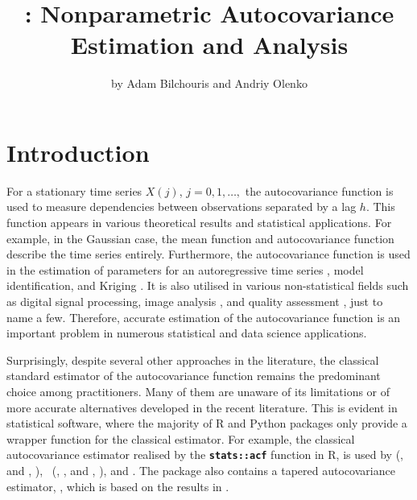 \title{: Nonparametric Autocovariance Estimation and
Analysis}
\author{by Adam Bilchouris and Andriy Olenko}


\maketitle

\section{Introduction}\label{introduction}

For a stationary time series \(X(j)\), \(j = 0, 1, \dots,\) the
autocovariance function is used to measure dependencies between
observations separated by a lag \(h.\) This function appears in various
theoretical results and statistical applications. For example, in the
Gaussian case, the mean function and autocovariance function describe
the time series entirely. Furthermore, the autocovariance function is
used in the estimation of parameters for an autoregressive time series
\citep[Chapter~8.1]{Brockwell1991}, model identification, and Kriging
\citep[Chapter~3.2]{Cressie1993}. It is also utilised in various
non-statistical fields such as digital signal processing, image analysis
\citep[Chapter~3.2]{Bull2021}, and quality assessment \citep{chemo2003},
just to name a few. Therefore, accurate estimation of the autocovariance
function is an important problem in numerous statistical and data
science applications.

Surprisingly, despite several other approaches in the literature, the
classical standard estimator of the autocovariance function remains the
predominant choice among practitioners. Many of them are unaware of its
limitations or of more accurate alternatives developed in the recent
literature. This is evident in statistical software, where the majority
of R and Python packages only provide a wrapper function for the
classical estimator. For example, the classical autocovariance estimator
realised by the \textbf{\texttt{stats::acf}} function in R, is used by
 (\citeauthor{TSA_2022}, \citeyear{TSA_2022} and
\citeauthor{Cryer2008}, \citeyear{Cryer2008}),
~(\citeauthor{astsa_2024}, \citeyear{astsa_2024}, and
\citeauthor{Shumway2025}, \citeyear{Shumway2025}), 
\citep{sarima_2024} and  \citep{Hyndman2008}. The
package  also contains a tapered autocovariance
estimator, , which is based on the results in
\cite{McMurry2010, Hyndman2015}.

